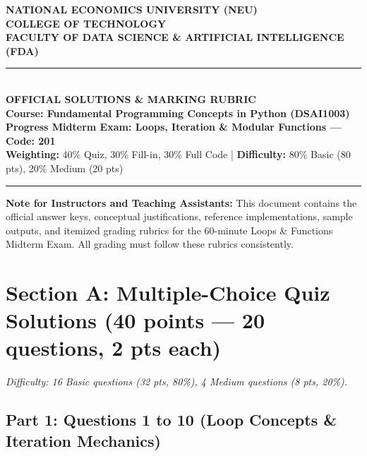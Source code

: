 \documentclass[11pt,a4paper]{article}
\begin{document}
\begin{center}
  {\Large\textbf{NATIONAL ECONOMICS UNIVERSITY (NEU)}}\\[0.06cm]
  {\large\textbf{COLLEGE OF TECHNOLOGY}}\\[0.04cm]
  {\large\textbf{FACULTY OF DATA SCIENCE \& ARTIFICIAL INTELLIGENCE (FDA)}}\\[0.12cm]
  \rule{\textwidth}{1.2pt}\\[0.12cm]
  {\LARGE\bfseries\color{primaryblue}OFFICIAL SOLUTIONS \& MARKING RUBRIC}\\[0.06cm]
  {\large\textbf{Course: Fundamental Programming Concepts in Python (DSAI1003)}}\\[0.06cm]
  {\normalsize\textbf{Progress Midterm Exam: Loops, Iteration \& Modular Functions --- Code: 201}}\\[0.05cm]
  {\footnotesize\textbf{Weighting:} 40\% Quiz, 30\% Fill-in, 30\% Full Code \quad | \quad \textbf{Difficulty:} 80\% Basic (80 pts), 20\% Medium (20 pts)}\\[0.08cm]
  \rule{\textwidth}{0.6pt}
\end{center}

\vspace{0.05cm}

\begin{tcolorbox}[colback=green!8, colframe=correctgreen, arc=1.2mm, boxrule=0.6pt, left=2.0mm, right=2.0mm, top=0.8mm, bottom=0.8mm]
\small
\textbf{Note for Instructors and Teaching Assistants:}
This document contains the official answer keys, conceptual justifications, reference implementations, sample outputs, and itemized grading rubrics for the 60-minute Loops \& Functions Midterm Exam. All grading must follow these rubrics consistently.
\end{tcolorbox}

\vspace{0.05cm}

\section*{Section A: Multiple-Choice Quiz Solutions (40 points --- 20 questions, 2 pts each)}
\textit{Difficulty: 16 Basic questions (32 pts, 80\%), 4 Medium questions (8 pts, 20\%).}

\subsection*{Part 1: Questions 1 to 10 (Loop Concepts \& Iteration Mechanics)}
\end{document}
